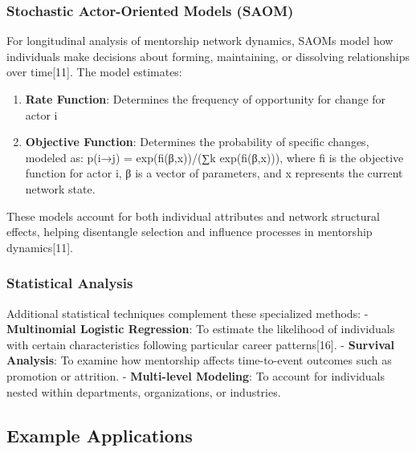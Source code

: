 \documentclass[
  letterpaper,
  DIV=11,
  numbers=noendperiod]{scrartcl}
\providecommand{\tightlist}{%
  \setlength{\itemsep}{0pt}\setlength{\parskip}{0pt}}
\begin{document}
\subsubsection{Stochastic Actor-Oriented Models
(SAOM)}\label{stochastic-actor-oriented-models-saom}

For longitudinal analysis of mentorship network dynamics, SAOMs model
how individuals make decisions about forming, maintaining, or dissolving
relationships over time{[}11{]}. The model estimates:

\begin{enumerate}
\def\labelenumi{\arabic{enumi}.}
\tightlist
\item
  \textbf{Rate Function}: Determines the frequency of opportunity for
  change for actor i
\item
  \textbf{Objective Function}: Determines the probability of specific
  changes, modeled as: p(i→j) = exp(fi(β,x))/(∑k exp(fi(β,x))), where fi
  is the objective function for actor i, β is a vector of parameters,
  and x represents the current network state.
\end{enumerate}

These models account for both individual attributes and network
structural effects, helping disentangle selection and influence
processes in mentorship dynamics{[}11{]}.

\subsubsection{Statistical Analysis}\label{statistical-analysis}

Additional statistical techniques complement these specialized methods:
- \textbf{Multinomial Logistic Regression}: To estimate the likelihood
of individuals with certain characteristics following particular career
patterns{[}16{]}. - \textbf{Survival Analysis}: To examine how
mentorship affects time-to-event outcomes such as promotion or
attrition. - \textbf{Multi-level Modeling}: To account for individuals
nested within departments, organizations, or industries.

\subsection{Example Applications}\label{example-applications}
\end{document}
